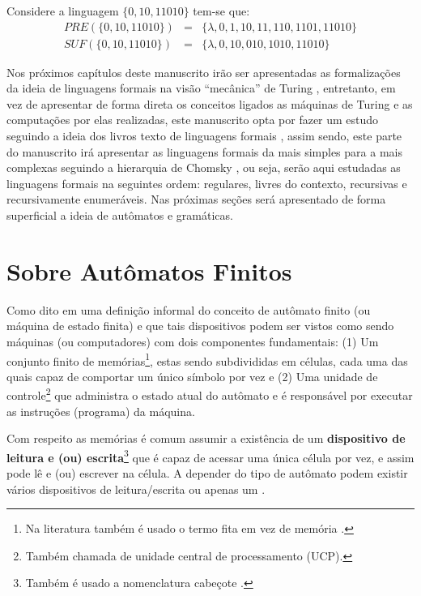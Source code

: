 \begin{example}
	Considere a linguagem $\{0, 10, 11010\}$ tem-se que:
	\begin{eqnarray*}
		PRE(\{0, 10, 11010\}) & = & \{\lambda, 0, 1, 10, 11, 110, 1101, 11010\}\\
		SUF(\{0, 10, 11010\}) & = & \{\lambda, 0, 10, 010, 1010, 11010\}
	\end{eqnarray*}
\end{example}

Nos próximos capítulos deste manuscrito irão ser apresentadas as formalizações da ideia de linguagens formais na visão ``mecânica'' de Turing \cite{turing1937}, entretanto, em vez de apresentar de forma direta os conceitos ligados as máquinas de Turing e as computações por elas realizadas, este manuscrito opta por fazer um estudo seguindo a ideia dos livros texto de linguagens formais \cite{benjaLivro2010, linz2006, menezes1998LFA}, assim sendo, este parte do manuscrito irá apresentar as linguagens formais da mais simples para a mais complexas seguindo a hierarquia de Chomsky \cite{chomsky1956}, ou seja, serão aqui estudadas as linguagens formais na seguintes ordem: regulares, livres do contexto, recursivas e recursivamente enumeráveis. Nas próximas seções será apresentado de forma superficial a ideia de autômatos e gramáticas.

\section{Sobre Autômatos Finitos}\label{sec:Automato}

Como dito em \cite{valdi2016master, valdi2020phd} uma definição informal do conceito de autômato finito (ou máquina de estado finita) e que tais dispositivos podem ser vistos como sendo máquinas (ou computadores) com dois componentes fundamentais: (1) Um conjunto finito de memórias\footnote{Na literatura também é usado o termo fita em vez de memória \cite{menezes1998LFA}.}, estas sendo subdivididas em células, cada uma das quais capaz de comportar um único símbolo por vez e (2) Uma unidade de controle\footnote{Também chamada de unidade central de processamento (UCP).} que  administra o estado atual do autômato e é responsável por executar as instruções (programa) da máquina.

Com respeito as memórias é comum assumir a existência de um \textbf{dispositivo de leitura e (ou) escrita}\footnote{Também é usado a nomenclatura cabeçote \cite{valdi2020phd, valdi2016master}.} que é capaz de acessar uma única célula por vez, e assim pode lê e (ou) escrever na célula. A depender do tipo de autômato podem existir vários dispositivos de leitura/escrita ou apenas um \cite{benjaLivro2010}.


